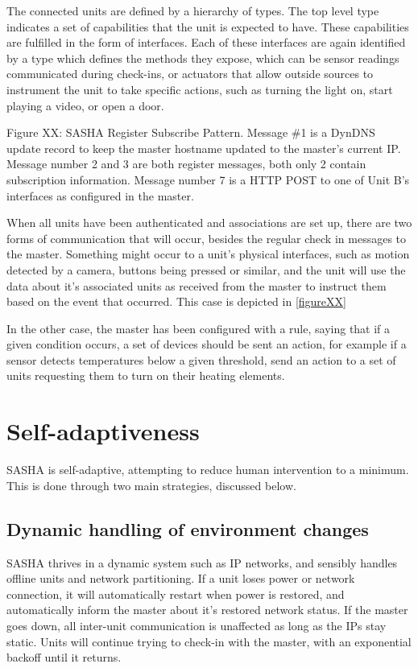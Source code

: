 The connected units are defined by a hierarchy of types. The top level type indicates a set of capabilities that the unit is expected to have. These capabilities are fulfilled in the form of interfaces. Each of these interfaces are again identified by a type which defines the methods they expose, which can be sensor readings communicated during check-ins, or actuators that allow outside sources to instrument the unit to take specific actions, such as turning the light on, start playing a video, or open a door.


Figure XX: SASHA Register Subscribe Pattern. Message \#1 is a DynDNS update record to keep the master hostname updated to the master’s current IP. Message number 2 and 3 are both register messages, both only 2 contain subscription information. Message number 7 is a HTTP POST to one of Unit B’s interfaces as configured in the master.

When all units have been authenticated and associations are set up, there are two forms of communication that will occur, besides the regular check in messages to the master. Something might occur to a unit’s physical interfaces, such as motion detected by a camera, buttons being pressed or similar, and the unit will use the data about it’s associated units as received from the master to instruct them based on the event that occurred. This case is depicted in \autoref{figureXX}

In the other case, the master has been configured with a rule, saying that if a given condition occurs, a set of devices should be sent an action, for example if a sensor detects temperatures below a given threshold, send an action to a set of units requesting them to turn on their heating elements.
\section{Self-adaptiveness}
SASHA is self-adaptive, attempting to reduce human intervention to a minimum. This is done through two main strategies, discussed below.

\subsection{Dynamic handling of environment changes}
SASHA thrives in a dynamic system such as IP networks, and sensibly handles offline units and network partitioning. If a unit loses power or network connection, it will automatically restart when power is restored, and automatically inform the master about it’s restored network status. If the master goes down, all inter-unit communication is unaffected as long as the IPs stay static. Units will continue trying to check-in with the master, with an exponential backoff until it returns.

